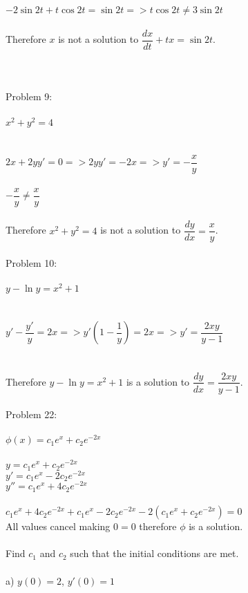 \documentclass[12pt]{exam}
\begin{document}
$-2\sin{2t}+t\cos{2t}=\sin{2t} => t\cos{2t}\neq3\sin{2t}$\\\\
Therefore $x$ is not a solution to $\dfrac{dx}{dt}+tx=\sin{2t}$.\\\\\\\\
Problem 9:\\\\
$x^2+y^2=4$ \\\\
\\$2x+2yy'=0=>2yy'=-2x=>y'=-\dfrac{x}{y}$\\\\
$-\dfrac{x}{y}\neq\dfrac{x}{y}$\\\\
Therefore $x^2+y^2=4$ is not a solution to $\dfrac{dy}{dx}=\dfrac{x}{y}$.\\\\
Problem 10:\\\\
$y-\ln{y}=x^2+1$ \\\\
\\$y'-\dfrac{y'}{y}=2x=>y'\left(1-\dfrac{1}{y}\right)=2x=>y'=\dfrac{2xy}{y-1}$\\\\
\\Therefore $y-\ln{y}=x^2+1$ is a solution to $\dfrac{dy}{dx}=\dfrac{2xy}{y-1}$.\\\\
Problem 22:\\\\
$\phi(x)=c_1e^x+c_2e^{-2x}$\\\\
$y=c_1e^x+c_2e^{-2x}$\\
$y'=c_1e^x-2c_2e^{-2x}$\\
$y''=c_1e^x+4c_2e^{-2x}$\\\\
$c_1e^x+4c_2e^{-2x}+c_1e^x-2c_2e^{-2x}-2(c_1e^x+c_2e^{-2x})=0$\\
All values cancel making $0=0$ therefore $\phi$ is a solution.\\\\
Find $c_1$ and $c_2$ such that the initial conditions are met.\\\\
a) $y(0)=2$, $y'(0)=1$\\\\
\end{document}

